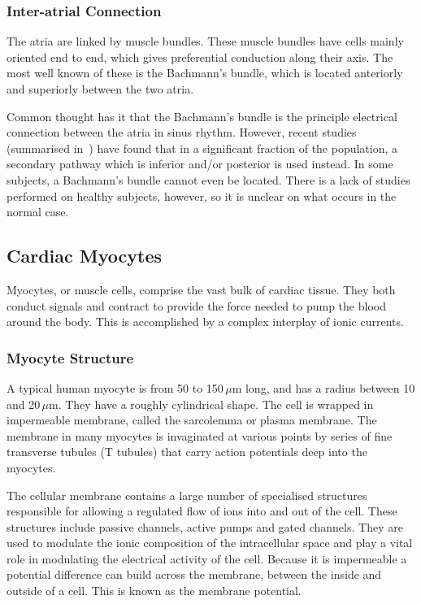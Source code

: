 \subsubsection{Inter-atrial Connection}

The atria are linked by muscle bundles.
These muscle bundles have cells mainly oriented end to end, which gives
preferential conduction along their axis.
The most well known of these is the Bachmann's bundle, which is located
anteriorly and superiorly between the two atria.

Common thought has it that the Bachmann's bundle is the principle electrical
connection between the atria in sinus rhythm.
However, recent studies (summarised in~\cite{Platonov2007,Platonov2008}) have
found that in a significant fraction of the population, a secondary pathway
which is inferior and/or posterior is used instead.
In some subjects, a Bachmann's bundle cannot even be located.
There is a lack of studies performed on healthy subjects, however, so it is
unclear on what occurs in the normal case.

\subsection{Cardiac Myocytes}

Myocytes, or muscle cells, comprise the vast bulk of cardiac tissue.
They both conduct signals and contract to provide the force needed to pump the
blood around the body.
This is accomplished by a complex interplay of ionic currents.

\subsubsection{Myocyte Structure}

A typical human myocyte is from 50 to 150$\,\mu$m long, and has a radius
between 10 and 20$\,\mu$m.
They have a roughly cylindrical shape.
The cell is wrapped in impermeable membrane, called the sarcolemma or plasma
membrane.
The membrane in many myocytes is invaginated at various points by series of
fine transverse tubules (T tubules) that carry action potentials deep into the
myocytes.

The cellular membrane contains a large number of specialised structures
responsible for allowing a regulated flow of ions into and out of the cell.
These structures include passive channels, active pumps and gated channels.
They are used to modulate the ionic composition of the intracellular
space and play a vital role in modulating the electrical activity of the cell.
Because it is impermeable a potential difference can build across the membrane,
between the inside and outside of a cell.
This is known as the membrane potential.

